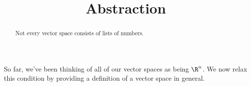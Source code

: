\documentclass{ximera}
\title{Abstraction}
\begin{document}
\begin{abstract}
  Not every vector space consists of lists of numbers.
\end{abstract}

So far, we've been thinking of all of our vector spaces as being
$\R^n$.  We now relax this condition by providing a definition of a
vector space in general.
\end{document}
